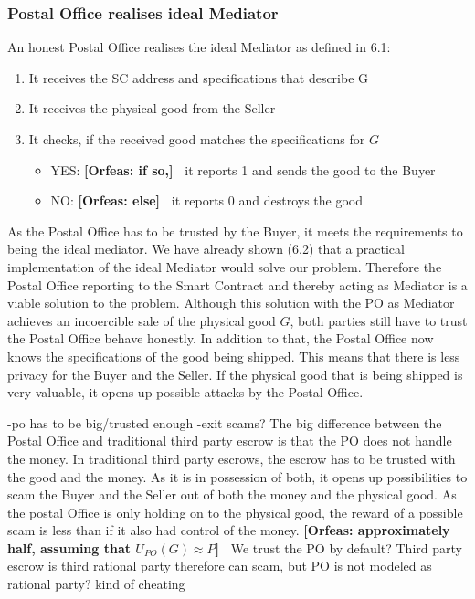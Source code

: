 \documentclass{cacthesis}
\newcommand{\authnote}[3]{{ \footnotesize \textbf{#1[#2: #3]~}}}
\newcommand{\orfnote}[1]{\authnote{\color{blue}}{Orfeas}{#1}}
\begin{document}
\subsubsection{Postal Office realises ideal Mediator}
An honest Postal Office realises the ideal Mediator as defined in 6.1:
\begin{enumerate}
    \item It receives the SC address and specifications that describe G
    \item It receives the physical good from the Seller
    \item It checks, if the received good matches the specifications for $G$
        \begin{itemize}
            \item YES: \orfnote{if so,} it reports 1 and sends the good to the Buyer
            \item NO: \orfnote{else} it reports 0 and destroys the good
        \end{itemize}
\end{enumerate}
As the Postal Office has to be trusted by the Buyer, it meets the requirements to being the ideal mediator. We have already shown (6.2) that a practical implementation of the ideal Mediator would solve our problem. Therefore the Postal Office reporting to the Smart Contract and thereby acting as Mediator is a viable solution to the problem.
Although this solution with the PO as Mediator achieves an incoercible sale of the physical good $G$, both parties still have to trust the Postal Office behave honestly.\newline
In addition to that, the Postal Office now knows the specifications of the good being shipped. This means that there is less privacy for the Buyer and the Seller. If the physical good that is being shipped is very valuable, it opens up possible attacks by the Postal Office.\newline

-po has to be big/trusted enough\newline
-exit scams?
The big difference between the Postal Office and traditional third party escrow is that the PO does not handle the money. \newline
In traditional third party escrows, the escrow has to be trusted with the good and the money. As it is in possession of both, it opens up possibilities to scam the Buyer and the Seller out of both the money and the physical good.\newline
As the postal Office is only holding on to the physical good, the reward of a
possible scam is less than if it also had control of the money.
\orfnote{approximately half, assuming that $U_{PO}(G) \approx P$}\newline
We trust the PO by default? Third party escrow is third rational party therefore can scam, but PO is not modeled as rational party? kind of cheating
\end{document}
